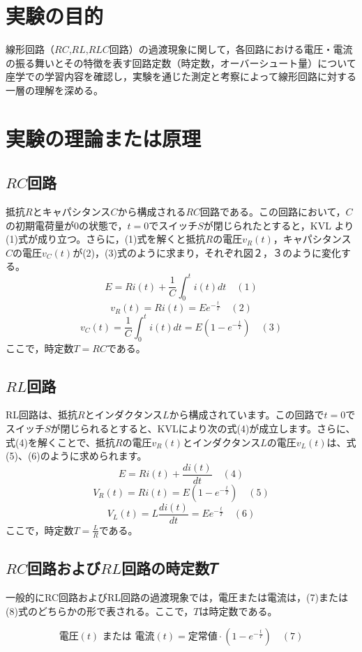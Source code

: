 \documentclass[a4paper,11pt,xelatex,ja=standard]{bxjsarticle}
\begin{document}
\section{実験の目的}
    線形回路（$RC$,$RL$,$RLC$回路）の過渡現象に関して，各回路における電圧・電流の振る舞いとその特徴を表す回路定数（時定数，オーバーシュート量）について座学での学習内容を確認し，実験を通じた測定と考察によって線形回路に対する一層の理解を深める。
\section{実験の理論または原理}
    \subsection{$RC$回路}
        抵抗\(R\)とキャパシタンス\(C\)から構成される\(RC\)回路である。この回路において，\(C\)の初期電荷量が0の状態で，\(t = 0\)でスイッチ\(S\)が閉じられたとすると，KVL より(1)式が成り立つ。さらに，(1)式を解くと抵抗\(R\)の電圧\(v_R (t)\)，キャパシタンス\(C\)の電圧\(v_C (t)\)が(2)，(3)式のように求まり，それぞれ図２，３のように変化する。
        \[ E = R i(t) + \frac{1}{C} \int_0^t i(t) dt \quad (1) \]
        \[ v_R (t) = R i(t) = E e^{-\frac{t}{T}} \quad (2) \]
        \[ v_C(t) = \frac{1}{C} \int_0^t i(t) dt = E (1 - e^{-\frac{t}{T}}) \quad (3) \]
        ここで，時定数\(T = RC\)である。


    \subsection{$RL$回路}
        RL回路は、抵抗\(R\)とインダクタンス\(L\)から構成されています。この回路で\(t = 0\)でスイッチ\(S\)が閉じられるとすると、KVLにより次の式(4)が成立します。さらに、式(4)を解くことで、抵抗\(R\)の電圧\(v_R(t)\)とインダクタンス\(L\)の電圧\(v_L(t)\)は、式(5)、(6)のように求められます。
        \[ E = Ri(t) + \frac{di(t)}{dt} \quad (4)\]
        \[ V_R(t) = Ri(t) = E(1-e^{-\frac{t}{T}}) \quad (5)\]
        \[ V_L(t) = L\frac{di(t)}{dt} = Ee^{-\frac{t}{T}} \quad (6)\]
        ここで，時定数\(T = \frac{L}{R}\)である。
    \subsection{$RC$回路および$RL$回路の時定数𝑇}
        一般的にRC回路およびRL回路の過渡現象では，電圧または電流は，(7)または(8)式のどちらかの形で表される。ここで，\( T \)は時定数である。

        \[
        \text{電圧}(t) \text{ または 電流}(t) = \text{定常値} \cdot \left( 1 - e^{-\frac{t}{T}} \right) \quad (7)
        \]
        
\end{document}
